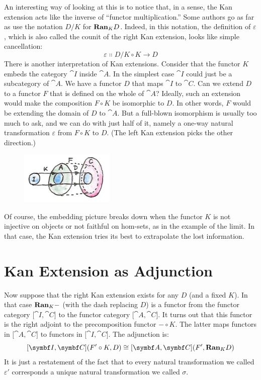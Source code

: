 \noindent
An interesting way of looking at this is to notice that, in a sense, the
Kan extension acts like the inverse of ``functor multiplication.'' Some
authors go as far as use the notation $D/K$ for $\mathbf{Ran}_{K}D$.
Indeed, in this notation, the definition of $\varepsilon$, which is also
called the counit of the right Kan extension, looks like simple
cancellation:
\[\varepsilon \Colon D/K \circ K \to D\]
There is another interpretation of Kan extensions. Consider that the
functor $K$ embeds the category $\cat{I}$ inside $\cat{A}$. In the
simplest case $\cat{I}$ could just be a subcategory of $\cat{A}$. We have
a functor $D$ that maps $\cat{I}$ to $\cat{C}$. Can we extend
$D$ to a functor $F$ that is defined on the whole of
$\cat{A}$? Ideally, such an extension would make the composition
$F \circ K$ be isomorphic to $D$. In other words, $F$
would be extending the domain of $D$ to $\cat{A}$. But a
full-blown isomorphism is usually too much to ask, and we can do with
just half of it, namely a one-way natural transformation $\varepsilon$ from
$F \circ K$ to $D$. (The left Kan extension picks the other direction.)

\begin{figure}[H]
  \centering
  \includegraphics[width=0.4\textwidth]{images/kan6.jpg}
\end{figure}

\noindent
Of course, the embedding picture breaks down when the functor $K$
is not injective on objects or not faithful on hom-sets, as in the
example of the limit. In that case, the Kan extension tries its best to
extrapolate the lost information.

\section{Kan Extension as Adjunction}

Now suppose that the right Kan extension exists for any $D$ (and
a fixed $K$). In that case $\mathbf{Ran}_{K}-$ (with the dash
replacing $D$) is a functor from the functor category
${[}\cat{I}, \cat{C}{]}$ to the functor category ${[}\cat{A}, \cat{C}{]}$. It
turns out that this functor is the right adjoint to the precomposition
functor $- \circ K$. The latter maps functors in ${[}\cat{A}, \cat{C}{]}$
to functors in ${[}\cat{I}, \cat{C}{]}$. The adjunction is:
\[[\cat{I}, \cat{C}](F' \circ K, D) \cong [\cat{A}, \cat{C}](F', \Ran_{K}D)\]
It is just a restatement of the fact that to every natural
transformation we called $\varepsilon'$ corresponds a unique natural
transformation we called $\sigma$.


